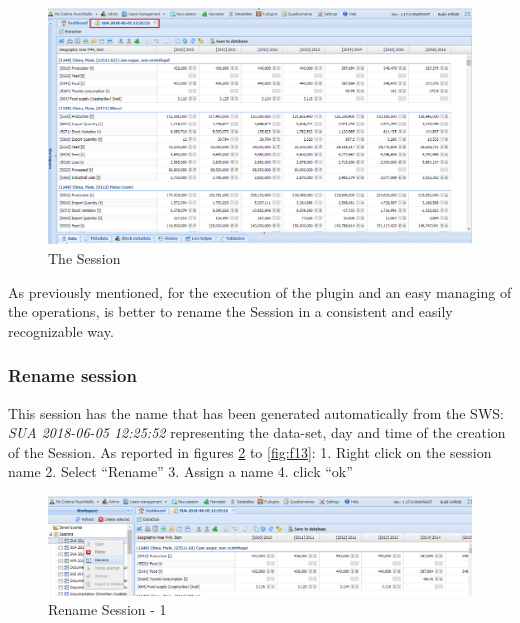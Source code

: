 \documentclass[]{article}
\begin{document}
\begin{figure}[H]

{\centering \includegraphics[width=1\linewidth]{images/standPlugin/10_session2} 

}

\caption{\label{fig:f10}The Session}\label{fig:f10}
\end{figure}

As previously mentioned, for the execution of the plugin and an easy
managing of the operations, is better to rename the Session in a
consistent and easily recognizable way.

\subsubsection{Rename session}\label{rename-session}

This session has the name that has been generated automatically from the
SWS: \emph{SUA 2018-06-05 12:25:52} representing the data-set, day and
time of the creation of the Session. As reported in figures
\ref{fig:f11} to \ref{fig:f13}: 1. Right click on the session name 2.
Select ``Rename'' 3. Assign a name 4. click ``ok''

\begin{figure}[H]

{\centering \includegraphics[width=1\linewidth]{images/standPlugin/11_selectRenameSession} 

}

\caption{\label{fig:f11}Rename Session - 1}\label{fig:f11}
\end{figure}
\end{document}
